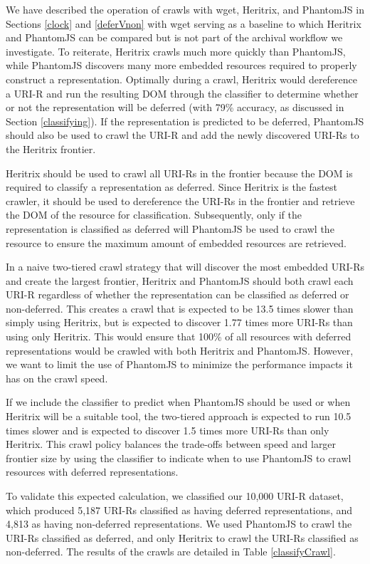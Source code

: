 \documentclass{ipres_proc_article-sp}
\begin{document}
We have described the operation of crawls with wget, Heritrix, and PhantomJS in Sections \ref{clock} and \ref{deferVnon} with wget serving as a baseline to which Heritrix and PhantomJS can be compared but is not part of the archival workflow we investigate. To reiterate, Heritrix crawls much more quickly than PhantomJS, while PhantomJS discovers many more embedded resources required to properly construct a representation. Optimally during a crawl, Heritrix would dereference a URI-R and run the resulting DOM through the classifier to determine whether or not the representation will be deferred (with 79\% accuracy, as discussed in Section \ref{classifying}). If the representation is predicted to be deferred, PhantomJS should also be used to crawl the URI-R and add the newly discovered URI-Rs to the Heritrix frontier.

Heritrix should be used to crawl all URI-Rs in the frontier because the DOM is required to classify a representation as deferred. Since Heritrix is the fastest crawler, it should be used to dereference the URI-Rs in the frontier and retrieve the DOM of the resource for classification. Subsequently, only if the representation is classified as deferred will PhantomJS be used to crawl the resource to ensure the maximum amount of embedded resources are retrieved.

In a naive two-tiered crawl strategy that will discover the most embedded URI-Rs and create the largest frontier, Heritrix and PhantomJS should both crawl each URI-R regardless of whether the representation can be classified as deferred or non-deferred. This creates a crawl that is expected to be 13.5 times slower than simply using Heritrix, but is expected to discover 1.77 times more URI-Rs than using only Heritrix. This would ensure that 100\% of all resources with deferred representations would be crawled with both Heritrix and PhantomJS. However, we want to limit the use of PhantomJS to minimize the performance impacts it has on the crawl speed.

If we include the classifier to predict when PhantomJS should be used or when Heritrix will be a suitable tool, the two-tiered approach is expected to run 10.5 times slower and is expected to discover 1.5 times more URI-Rs than only Heritrix. This crawl policy balances the trade-offs between speed and larger frontier size by using the classifier to indicate when to use PhantomJS to crawl resources with deferred representations.

To validate this expected calculation, we classified our 10,000 URI-R dataset, which produced 5,187 URI-Rs classified as having deferred representations, and 4,813 as having non-deferred representations. We used PhantomJS to crawl the URI-Rs classified as deferred, and only Heritrix to crawl the URI-Rs classified as non-deferred. The results of the crawls are detailed in Table \ref{classifyCrawl}.
\end{document}
